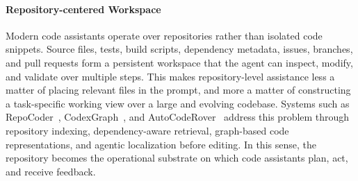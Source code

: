 \documentclass{llmxive}
\begin{document}
\paragraph{Repository-centered Workspace}
Modern code assistants operate over repositories rather than isolated code
snippets. Source files, tests, build scripts, dependency metadata, issues,
branches, and pull requests form a persistent workspace that the agent can
inspect, modify, and validate over multiple steps. This makes repository-level
assistance less a matter of placing relevant files in the prompt, and more a
matter of constructing a task-specific working view over a large and evolving
codebase. Systems such as RepoCoder~\cite{zhang2023repocoder}, CodexGraph~\cite{liu2024codexgraphbridginglargelanguage}, and AutoCodeRover~\cite{zhang2024autocoderover} address this
problem through repository indexing, dependency-aware retrieval, graph-based
code representations, and agentic localization before editing. In this sense, the repository
becomes the operational substrate on which code assistants plan, act, and
receive feedback.
\end{document}
